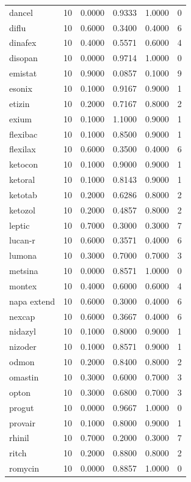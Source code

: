 \begin{longtable}{p{3.0cm}rrrrr}
dancel & 10 & 0.0000 & 0.9333 & 1.0000 & 0 \\
diflu & 10 & 0.6000 & 0.3400 & 0.4000 & 6 \\
dinafex & 10 & 0.4000 & 0.5571 & 0.6000 & 4 \\
disopan & 10 & 0.0000 & 0.9714 & 1.0000 & 0 \\
emistat & 10 & 0.9000 & 0.0857 & 0.1000 & 9 \\
esonix & 10 & 0.1000 & 0.9167 & 0.9000 & 1 \\
etizin & 10 & 0.2000 & 0.7167 & 0.8000 & 2 \\
exium & 10 & 0.1000 & 1.1000 & 0.9000 & 1 \\
flexibac & 10 & 0.1000 & 0.8500 & 0.9000 & 1 \\
flexilax & 10 & 0.6000 & 0.3500 & 0.4000 & 6 \\
ketocon & 10 & 0.1000 & 0.9000 & 0.9000 & 1 \\
ketoral & 10 & 0.1000 & 0.8143 & 0.9000 & 1 \\
ketotab & 10 & 0.2000 & 0.6286 & 0.8000 & 2 \\
ketozol & 10 & 0.2000 & 0.4857 & 0.8000 & 2 \\
leptic & 10 & 0.7000 & 0.3000 & 0.3000 & 7 \\
lucan-r & 10 & 0.6000 & 0.3571 & 0.4000 & 6 \\
lumona & 10 & 0.3000 & 0.7000 & 0.7000 & 3 \\
metsina & 10 & 0.0000 & 0.8571 & 1.0000 & 0 \\
montex & 10 & 0.4000 & 0.6000 & 0.6000 & 4 \\
napa extend & 10 & 0.6000 & 0.3000 & 0.4000 & 6 \\
nexcap & 10 & 0.6000 & 0.3667 & 0.4000 & 6 \\
nidazyl & 10 & 0.1000 & 0.8000 & 0.9000 & 1 \\
nizoder & 10 & 0.1000 & 0.8571 & 0.9000 & 1 \\
odmon & 10 & 0.2000 & 0.8400 & 0.8000 & 2 \\
omastin & 10 & 0.3000 & 0.6000 & 0.7000 & 3 \\
opton & 10 & 0.3000 & 0.6800 & 0.7000 & 3 \\
progut & 10 & 0.0000 & 0.9667 & 1.0000 & 0 \\
provair & 10 & 0.1000 & 0.8000 & 0.9000 & 1 \\
rhinil & 10 & 0.7000 & 0.2000 & 0.3000 & 7 \\
ritch & 10 & 0.2000 & 0.8800 & 0.8000 & 2 \\
romycin & 10 & 0.0000 & 0.8857 & 1.0000 & 0 \\

\end{longtable}
